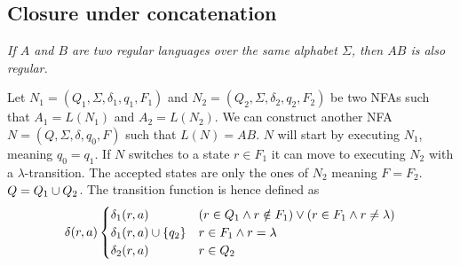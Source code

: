 \documentclass{article}
\newcommand{\emptyString}{\lambda}
\begin{document}
\begin{center}
\end{center}

\subsection{Closure under concatenation}

\textit{If \(A\) and \(B\) are two regular languages over the same alphabet
\(\Sigma\), then \(AB\) is also regular.}

Let \(N_1 = (Q_1, \Sigma, \delta_1, q_1, F_1)\) and
\(N_2 = (Q_2, \Sigma, \delta_2, q_2, F_2)\) be two NFAs such that
\(A_1 = L(N_1)\) and \(A_2 = L(N_2)\).
We can construct another NFA \(N=(Q, \Sigma, \delta, q_0, F)\)
such that \(L(N)=AB\).
\(N\) will start by executing \(N_1\), meaning \(q_0=q_1\). If \(N\) switches to a state
\(r\in F_1\) it can move to executing \(N_2\) with a \(\emptyString\)-transition.
The accepted states are only the ones of \(N_2\) meaning \(F=F_2\). \(Q=Q_1 \cup Q_2\).
The transition function is hence defined as
\[
    \delta(r, a)
    \begin{cases}
        \delta_1(r, a) & (r \in Q_1 \land r \notin F_1) \lor (r \in F_1 \land r \neq \emptyString) \\
        \delta_1(r, a) \union \{q_2\} & r \in F_1 \land r = \emptyString \\
        \delta_2(r, a) & r \in Q_2
    \end{cases}
\]
\end{document}
